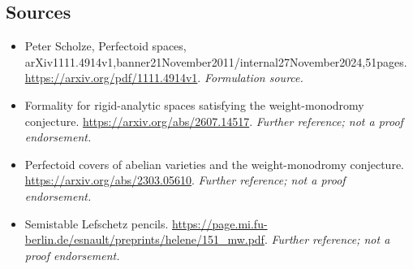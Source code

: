 \documentclass[11pt]{article}
\begin{document}
\subsection{Sources}
\begin{itemize}
\item[S1]Peter Scholze, Perfectoid spaces, arXiv1111.4914v1,banner21November2011/internal27November2024,51pages.
\url{https://arxiv.org/pdf/1111.4914v1}.
\textit{Formulation source.}
\item[S2]Formality for rigid-analytic spaces satisfying the weight-monodromy conjecture.
\url{https://arxiv.org/abs/2607.14517}.
\textit{Further reference; not a proof endorsement.}
\item[S3]Perfectoid covers of abelian varieties and the weight-monodromy conjecture.
\url{https://arxiv.org/abs/2303.05610}.
\textit{Further reference; not a proof endorsement.}
\item[S4]Semistable Lefschetz pencils.
\url{https://page.mi.fu-berlin.de/esnault/preprints/helene/151_mw.pdf}.
\textit{Further reference; not a proof endorsement.}
\end{itemize}
\end{document}
